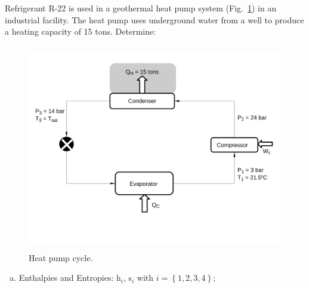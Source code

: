 \documentclass[calculator,steamtables,refrigeranttables,psychrometricchart,datasheet,resit]{exam}
\begin{document}
\begin{question}

Refrigerant R-22 is used in a geothermal heat pump system (Fig.~\ref{Exam01_Prob4}) in an industrial facility. The heat pump uses underground water from a well to produce a heating capacity of 15 tons. Determine:
\begin{figure}[!h]
\begin{center}
\includegraphics[width=12.0cm,height=9.0cm]{./Pics/Exam_Refrigeration14-15}
\end{center}
\vspace{-1.8cm}
\caption{Heat pump cycle.}\label{Exam01_Prob4}
\end{figure}
\begin{enumerate}[(a)]
 \item Enthalpies and Entropies: h$_{i}$, s$_{i}$ with $i=\left\{1,2,3,4\right\}$;~
\end{enumerate}
\end{question}
\end{document}
